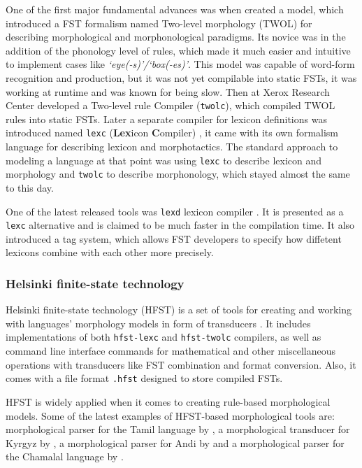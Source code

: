 One of the first major fundamental advances was when \parencite{koskenniemi_twol_1983} created a model, which introduced a FST formalism named Two-level morphology (TWOL) for describing morphological and morphonological paradigms. Its novice was in the addition of the phonology level of rules, which made it much easier and intuitive to implement cases like \textit{`eye(-s)'/`box(-es)'}. This model was capable of word-form recognition and production, but it was not yet compilable into static FSTs, it was working at runtime and was known for being slow. Then \textcite{karttunen_twolc_1987} at Xerox Research Center developed a Two-level rule Compiler (\texttt{twolc}), which compiled TWOL rules into static FSTs. Later a separate compiler for lexicon definitions was introduced named \texttt{lexc} (\textbf{Lex}icon \textbf{C}ompiler) \parencite{karttunen_lexc_1993}, it came with its own formalism language for describing lexicon and morphotactics. The standard approach to modeling a language at that point was using \texttt{lexc} to describe lexicon and morphology and \texttt{twolc} to describe morphonology, which stayed almost the same to this day. 

One of the latest released tools was \texttt{lexd} lexicon compiler \parencite{swanson_lexd_2021}. It is presented as a \texttt{lexc} alternative and is  claimed to be much faster in the compilation time. It also introduced a tag system, which allows FST developers to specify how diffetent lexicons combine with each other more precisely. 

\subsubsection{Helsinki finite-state technology}
Helsinki finite-state technology (HFST) is a set of tools for creating and working with languages' morphology models in form of transducers \parencite{linden_hfst_2009}. It includes implementations of both \texttt{hfst-lexc} and \texttt{hfst-twolc} compilers, as well as command line interface commands for mathematical and other miscellaneous operations with transducers like FST combination and format conversion. Also, it comes with a file format \texttt{.hfst} designed to store compiled FSTs.

HFST is widely applied when it comes to creating rule-based morphological models. Some of the latest examples of HFST-based morphological tools are: morphological parser for the Tamil language by \textcite{sarveswaran_morph_2021}, a morphological transducer for Kyrgyz by \textcite{washington_finite_2012}, a morphological parser for Andi by \textcite{buntyakova_2023_twol} and a morphological parser for the Chamalal language by \textcite{budilova_2023_twol}.

